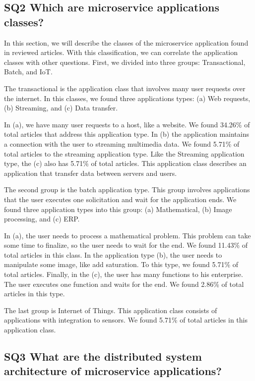 \subsection{SQ2 Which are microservice applications classes?}
In this section, we will describe the classes of the microservice application found in reviewed articles. With this classification, we can correlate the application classes with other questions. First, we divided into three groups: Transactional, Batch, and IoT. 

The transactional is the application class that involves many user requests over the internet. In this classes, we found three applications types: (a) Web requests, (b) Streaming, and (c) Data transfer. 

In (a), we have many user requests to a host, like a website. We found 34.26\% of total articles that address this application type. In (b) the application maintains a connection with the user to streaming multimedia data. We found 5.71\% of total articles to the streaming application type. Like the Streaming application type, the (c) also has 5.71\% of total articles. This application class describes an application that transfer data between servers and users.

The second group is the batch application type. This group involves applications that the user executes one solicitation and wait for the application ends. We found three application types into this group: (a) Mathematical, (b) Image processing, and (c) ERP. 

In (a), the user needs to process a mathematical problem. This problem can take some time to finalize, so the user needs to wait for the end. We found 11.43\% of total articles in this class. In the application type (b), the user needs to manipulate some image, like add saturation. To this type, we found 5.71\% of total articles. Finally, in the (c), the user has many functions to his enterprise. The user executes one function and waits for the end. We found 2.86\% of total articles in this type.

The last group is Internet of Things. This application class consists of applications with integration to sensors. We found  5.71\% of total articles in this application class.

\subsection{SQ3 What are the distributed system architecture of microservice applications?}

